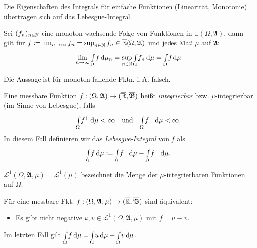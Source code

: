 \documentclass{cheat-sheet}
\newcommand{\Alg}{\mathfrak{A}} %
\newcommand{\Bor}{\mathfrak{B}} %
\newcommand{\E}{\mathbb{E}} %
\newcommand{\Leb}{\mathcal{L}} %
\theoremstyle{definition}
\newcommand{\IntOmu}[1]{\Int{\Omega}{}{#1}{\mu}} %
\begin{document}
\begin{satz}
  Die Eigenschaften des Integrals für einfache Funktionen (Linearität, Monotonie) übertragen sich auf das Lebesgue-Integral.
\end{satz}

\begin{satz}
  Sei $(f_n)_{n \in \mathbb{N}}$ eine monoton wachsende Folge von Funktionen in $\overline{\E}(\Omega, \Alg)$, dann gilt für $f \coloneqq \lim_{n \to \infty} f_n = \sup_{n \in \N} f_n \in \overline{\E}(\Omega, \Alg)$ und jedes Maß $\mu$ auf $\Alg$:
  \[ \lim_{n \to \infty} \IntOmu f_n = \sup_{n \in \N} \IntOmu{f_n} = \IntOmu{f} \]
\end{satz}

\begin{bem}
  Die Aussage ist für monoton fallende Fktn. i.\,A. falsch.
\end{bem}

\begin{defn}
  Eine messbare Funktion $f : (\Omega, \Alg) \to (\ER, \overline{\Bor})$ heißt \emph{integrierbar} bzw. $\mu$-integrierbar (im Sinne von Lebesgue), falls
  \[ \IntOmu{f^+} < \infty \quad \text{und} \quad \IntOmu{f^-} < \infty. \]
  In diesem Fall definieren wir das \emph{Lebesgue-Integral} von $f$ als
  \[ \IntOmu{f} \coloneqq \IntOmu{f^+} - \IntOmu{f^-}. \]
\end{defn}

\begin{nota}
  $\Leb^1(\Omega, \Alg, \mu) = \Leb^1(\mu)$ bezeichnet die Menge der $\mu$-integrierbaren Funktionen auf $\Omega$.
\end{nota}

\begin{satz}
  Für eine messbare Fkt. $f : (\Omega, \Alg, \mu) \to (\ER, \overline{\Bor})$ sind äquivalent:
  \begin{itemize}
    \item Es gibt nicht negative $u, v \in \Leb^1(\Omega, \Alg, \mu)$ mit $f = u - v$.
  \end{itemize}
  Im letzten Fall gilt $\IntOmu{f} = \IntOmu{u} - \IntOmu{v}$.
\end{satz}
\end{document}
